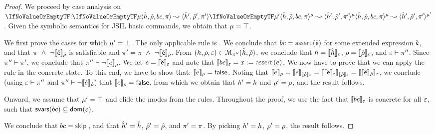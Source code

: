 \begin{proof}
We proceed by case analysis on $\symbtrans[][\mode][\mode']{\sheap, \sstore, \bcmd, \pc}{\sheap', \sstore', \pc'}$. 
Given the symbolic semantics for JSIL basic commands, we obtain that $\mode = \top$. 

\medskip
We first prove the cases for which $\mode' = \bot$. The only applicable rule is .
We conclude that  $\bcmd = \assert(\pvsexpr)$ for some extended expression $\pvsexpr$, and that
$\pc \ \wedge \  \neg\symbeval{\pvsexpr}{\sstore}$ is satisfiable and $\pc' = \pc \ \wedge \  \neg\symbeval{\pvsexpr}{\sstore}$. 
From $(\heap, \store, \senv) \in \smodels{\sheap, \sstore}{\pc''}$, we conclude that $\heap = \semexpr{\sheap}{\senv}$, $\store = \semexpr{\sstore}{\senv}$, and 
$\senv \vdash \pc''$. Since $\pc'' \vdash \pc'$,
we conclude that $\pc'' \vdash \neg\symbeval{\jsilexpr}{\sstore}$.
We let $\jsilexpr = \symbeval{\pvsexpr}{\senv}$ and note that $\symbeval{\bcmd}{\senv} = \jvar := \assert(\jsilexpr)$.
We now have to prove that we can apply the  rule in the concrete state.
To this end, we have to show that: $\symbeval{\jsilexpr}{\store} = \jfalse$. 
Noting that
$
  \symbeval{\jsilexpr}{\store} = 
  \symbeval{\jsilexpr}{\symbeval{\sstore}{\senv}} = 
  \symbeval{\symbeval{\pvsexpr}{\senv}}{\symbeval{\sstore}{\senv}} 
         = \symbeval{\symbeval{\pvsexpr}{\sstore}}{\senv} 
$, we conclude (using $\senv \vdash \pc''$ and $\pc'' \vdash  \neg\symbeval{\sexpr}{\sstore}$) that 
$\symbeval{\jsilexpr}{\store} = \jfalse$, from which we obtain that $\heap' = \heap$ and $\store' = \store$, and the result follows. 

\medskip
Onward, we assume that $\mode' = \top$ and elide the modes from the rules.
Throughout the proof, we use the fact that $\symbeval{\bcmd}{\senv}$ is concrete for all $\senv$, such that $\svarsreallyqueen(\bcmd) \subseteq \domain(\senv)$.
\vspace{5pt}

\noindent{} 
We conclude that $\bcmd = \jsilskip$, and 
that $\sheap' = \sheap$, $\sstore' = \sstore$, and $\pc' = \pc$. 
By picking $\heap' = \heap$, $\store' = \store$, the result follows. 
\vspace{6pt}


\end{proof}
